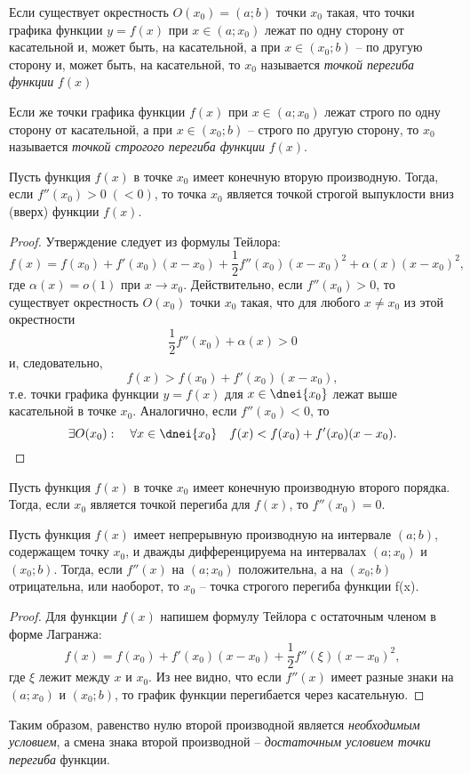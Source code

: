 \begin{defn}
Если существует окрестность $O(x_0)=(a;b)$ точки $x_0$ такая, что точки графика функции $y=f(x)$ при $x\in (a;x_0)$ лежат по одну сторону от касательной и, может быть, на касательной, а при $x\in(x_0;b)$ -- по другую сторону и, может быть, на касательной, то $x_0$ называется \textit{точкой перегиба функции} $f(x)$

Если же точки графика функции $f(x)$ при $x\in(a;x_0)$ лежат строго по одну сторону от касательной, а при $x\in (x_0;b)$ -- строго по другую сторону, то $x_0$ называется \textit{точкой строгого перегиба функции} $f(x)$.
\end{defn}

\begin{thm}
Пусть функция $f(x)$ в точке $x_0$ имеет конечную вторую производную. Тогда, если $f''(x_0)>0\; (<0)$, то точка $x_0$ является точкой строгой выпуклости вниз (вверх) функции $f(x)$. 
\end{thm}

\begin{proof}
Утверждение следует из формулы Тейлора:
$$
f(x)=f(x_0)+f'(x_0)(x-x_0)+\frac{1}{2}f''(x_0)(x-x_0)^2+\alpha(x)(x-x_0)^2,
$$
где $\alpha(x)=o(1)$ при $x\to x_0$. Действительно, если $f''(x_0)>0$, то существует окрестность $O(x_0)$ точки $x_0$ такая, что для любого $x\neq x_0$ из этой окрестности
$$
\frac{1}{2}f''(x_0)+\alpha(x)>0
$$
и, следовательно, 
$$
f(x)>f(x_0)+f'(x_0)(x-x_0),
$$
т.е. точки графика функции $y=f(x)$ для $x\in\dnei {x_0}$ лежат выше касательной в точке $x_0$. Аналогично, если $f''(x_0)<0$, то
$$
\exists O(x_0):\quad \forall x\in \dnei {x_0} \quad f(x)<f(x_0)+f'(x_0)(x-x_0).
$$
\end{proof}

\begin{cons}
Пусть функция $f(x)$ в точке $x_0$ имеет конечную производную второго порядка. Тогда, если $x_0$ является точкой перегиба для $f(x)$, то $f''(x_0)=0$.
\end{cons}

\begin{thm}
Пусть функция $f(x)$ имеет непрерывную производную на интервале $(a;b)$, содержащем точку $x_0$, и дважды дифференцируема на интервалах $(a;x_0)$ и $(x_0;b)$. Тогда, если $f''(x)$ на $(a;x_0)$ положительна, а на $(x_0;b)$ отрицательна, или наоборот, то $x_0$ -- точка строгого перегиба функции f(x). 
\end{thm}

\begin{proof}
Для функции $f(x)$ напишем формулу Тейлора с остаточным членом в форме Лагранжа:
$$
f(x)=f(x_0)+f'(x_0)(x-x_0)+\frac{1}{2}f''(\xi)(x-x_0)^2,
$$
где $\xi$ лежит между $x$ и $x_0$. Из нее видно, что если $f''(x)$ имеет разные знаки на $(a;x_0)$ и $(x_0;b)$, то график функции перегибается через касательную.
\end{proof}

Таким образом, равенство нулю второй производной является \textit{необходимым условием}, а смена знака второй производной  -- \textit{достаточным условием точки перегиба} функции.

